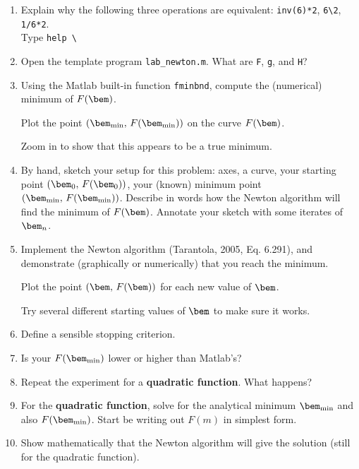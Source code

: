 \documentclass[11pt,titlepage,fleqn]{article}
\renewcommand{\vertgap}{\vspace{1.5cm}}
\begin{document}
\begin{enumerate}
\item Explain why the following three operations are equivalent: \verb+inv(6)*2+, \verb+6\2+, \verb+1/6*2+. \\
Type \verb+help \+

\vertgap

\item Open the template program \verb+lab_newton.m+.
What are \verb+F+, \verb+g+, and \verb+H+?

\vertgap

\item Using the Matlab built-in function \verb+fminbnd+, compute the (numerical) minimum of $F(\bem)$.

Plot the point $(\bem_{\rm min},\,F(\bem_{\rm min}))$ on the curve $F(\bem)$.

Zoom in to show that this appears to be a true minimum.

\item By hand, sketch your setup for this problem: axes, a curve, your starting point $(\bem_0,\,F(\bem_0))$, your (known) minimum point $(\bem_{\rm min},\,F(\bem_{\rm min}))$. Describe in words how the Newton algorithm will find the minimum of $F(\bem)$. Annotate your sketch with some iterates of $\bem_n$.

\vspace{10cm}

\item Implement the Newton algorithm (Tarantola, 2005, Eq. 6.291), and demonstrate (graphically or numerically) that you reach the minimum.

Plot the point $(\bem,\,F(\bem))$ for each new value of $\bem$.

Try several different starting values of $\bem$ to make sure it works.

\vertgap

\item Define a sensible stopping criterion.

\vertgap

\item Is your $F(\bem_{\rm min})$ lower or higher than Matlab's?

\vertgap

\item Repeat the experiment for a {\bf quadratic function}. What happens?



\item For the {\bf quadratic function}, solve for the analytical minimum $\bem_{\rm min}$ and also $F(\bem_{\rm min})$. Start be writing out $F(m)$ in simplest form.

\vspace{6cm}

\item Show mathematically that the Newton algorithm will give the solution (still for the quadratic function).

\end{enumerate}

%
%

\end{document}
